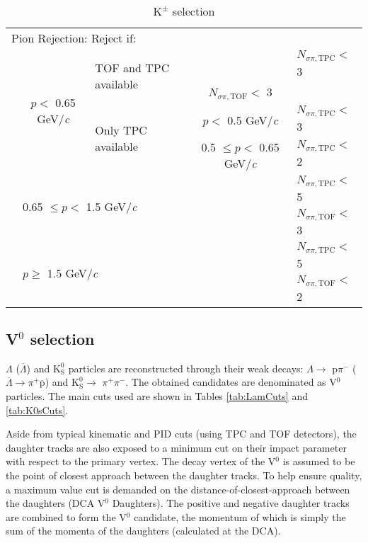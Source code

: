 \documentclass[ALICE,manyauthors]{cernphprep}
\newcommand{\Lam}{$\Lambda$\xspace}
\newcommand{\ALam}{$\overline{\Lambda}$\xspace}
\newcommand{\LamALam}{$\Lambda$ ($\overline{\Lambda}$)\xspace}
\newcommand{\Kpm}{$\mathrm{K^{\pm}}$\xspace}
\newcommand{\Ks}{$\mathrm{K^{0}_{S}}$\xspace}
\newcommand{\Vz}{V$^{0}$\xspace}
\begin{document}
\begin{table}[htbp]
\begin{tabular}{lcc|c|l}
   \multicolumn{5}{l}{Pion Rejection:  Reject if:} \\
   \cline{2-5}
   \multirow{4}{*}{} & \multirow{4}{*}{$p <$ 0.65 GeV/\textit{c}} & \multicolumn{1}{l}{\multirow{2}{*}{TOF and TPC available}} & \multicolumn{1}{c|}{} & $N_{\sigma \pi,\mathrm{TPC}} <$ 3 \\
   \multicolumn{4}{c|}{} & $N_{\sigma \pi,\mathrm{TOF}} <$ 3 \\
   \cline{3-5}
   \multicolumn{2}{c}{} & \multicolumn{1}{l|}{\multirow{2}{*}{Only TPC available}} & $p <$ 0.5 GeV/\textit{c} & $N_{\sigma \pi,\mathrm{TPC}} <$ 3 \\
   \cline{4-5}
   \multicolumn{3}{c|}{} & 0.5 $\leq p <$ 0.65 GeV/\textit{c} & $N_{\sigma \pi,\mathrm{TPC}} <$ 2 \\
   \cline{2-5}
    & \multicolumn{3}{l|}{\multirow{2}{*}{0.65 $\leq p <$ 1.5 GeV/\textit{c}}} & $N_{\sigma \pi,\mathrm{TPC}} <$ 5 \\
    \multicolumn{4}{c|}{} & $N_{\sigma \pi,\mathrm{TOF}} <$ 3 \\
   \cline{2-5}
    & \multicolumn{3}{l|}{\multirow{2}{*}{$p \geq$ 1.5 GeV/\textit{c}}} & $N_{\sigma \pi,\mathrm{TPC}} <$ 5 \\
    \multicolumn{4}{c|}{} & $N_{\sigma \pi,\mathrm{TOF}} <$ 2 \\
   \hline
  \end{tabular}
 \caption{\Kpm selection}
 \label{tab:KchCuts} 
\end{table}





\subsection{\Vz selection}
\label{sec:V0Selection}

\LamALam and \Ks particles are reconstructed through their weak decays: \Lam $\rightarrow$ p$\pi^{-}$ (\ALam $\rightarrow \pi^{+}\overline{\mathrm{p}}$) and \Ks $\rightarrow$ $\pi^{+}\pi^{-}$.
The obtained candidates are denominated as \Vz particles.
The main cuts used are shown in Tables \ref{tab:LamCuts} and \ref{tab:K0sCuts}.

Aside from typical kinematic and PID cuts (using TPC and TOF detectors), the daughter tracks are also exposed to a minimum cut on their impact parameter with respect to the primary vertex.  
The decay vertex of the \Vz is assumed to be the point of closest approach between the daughter tracks.
To help ensure quality, a maximum value cut is demanded on the distance-of-closest-approach between the daughters (DCA \Vz Daughters).
The positive and negative daughter tracks are combined to form the \Vz candidate, the momentum of which is simply the sum of the momenta of the daughters (calculated at the DCA).
\end{document}
